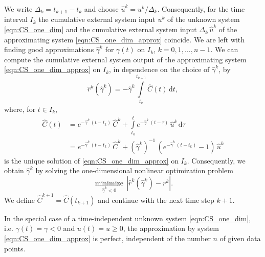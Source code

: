 \documentclass[11pt,a4paper]{article}
\newcommand{\dd}[1]{\,\mathrm{d}#1}
\newcommand{\intl}{\int\limits}
\begin{document}
        We write $\Delta_k=t_{k+1}-t_k$ and choose $\widehat{u}^k=u^k/\Delta_k$.
        Consequently, for the time interval $I_k$ the cumulative external system input $u^k$ of the unknown system \eqref{eqn:CS_one_dim} and the cumulative external system input $\Delta_k\,\widehat{u}^k$ of the approximating system \eqref{eqn:CS_one_dim_approx} coincide.
        We are left with finding good approximations $\widehat{\gamma}^k$ for $\gamma(t)$ on $I_k$, $k=0,1,\ldots,n-1$.
        We can compute the cumulative external system output of the approximating system \eqref{eqn:CS_one_dim_approx} on $I_k$, in dependence on the choice of $\widehat{\gamma}^k$, by
        \begin{equation*}
            \widehat{r}^k(\widehat{\gamma}^k) = -\widehat{\gamma}^k\intl_{t_k}^{t_{k+1}} \widehat{C}(t)\dd{t},
        \end{equation*}
        where, for $t\in I_k$,
        \begin{align*}
            \widehat{C}(t) &= e^{-\widehat{\gamma}^k\,(t-t_k)}\,\widehat{C}^k + \intl_{t_k}^t e^{-\widehat{\gamma}^k\,(t-\tau)}\,\widehat{u}^k\dd{\tau}\\
            &= e^{-\widehat{\gamma}^k\,(t-t_k)}\,\widehat{C}^k + (\widehat{\gamma}^k)^{-1}\,(e^{-\widehat{\gamma}^k\,(t-t_k)}-1)\,\widehat{u}^k
        \end{align*}
        is the unique solution of \eqref{eqn:CS_one_dim_approx} on $I_k$.
        Consequently, we obtain $\widehat{\gamma}^k$ by solving the one-dimensional nonlinear optimization problem
        \begin{equation*}
            \underset{\widehat{\gamma}^k<0}{\operatorname{minimize}}\,|\widehat{r}^k(\widehat{\gamma}^k)-r^k|.
        \end{equation*}
        We define $\widehat{C}^{k+1}=\widehat{C}(t_{k+1})$ and continue with the next time step $k+1$.
        
        In the special case of a time-independent unknown system \eqref{eqn:CS_one_dim}, i.e. $\gamma(t)=\gamma<0$ and $u(t)=u\geq0$, the approximation by system \eqref{eqn:CS_one_dim_approx} is perfect, independent of the number $n$ of given data points.\\
        
\end{document}
